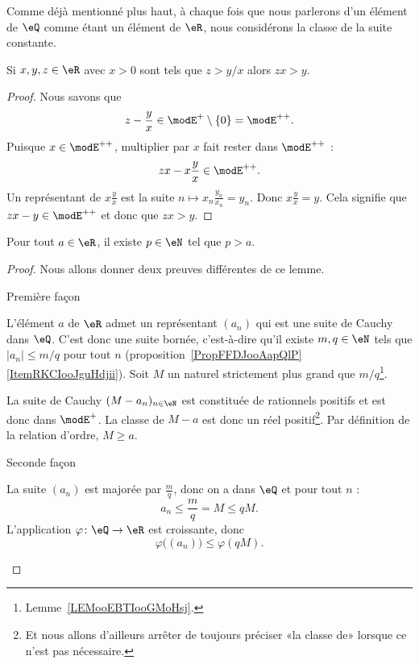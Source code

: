 \begin{remark}
	Comme déjà mentionné plus haut, à chaque fois que nous parlerons d'un élément de \( \eQ\) comme étant un élément de \( \eR\), nous considérons la classe de la suite constante.
\end{remark}

\begin{lemma}       \label{LemooYNOVooOwoRwD}
	Si \( x,y,z\in \eR\) avec \( x>0\) sont tels que \( z>y/x\) alors \( zx>y\).
\end{lemma}

\begin{proof}
	Nous savons que
	\begin{equation}
		z-\frac{ y }{ x }\in \modE^+\setminus\{ 0 \}=\modE^{++}.
	\end{equation}
	Puisque \( x\in\modE^{++}\), multiplier par \( x\) fait rester dans \( \modE^{++}\) :
	\begin{equation}
		zx-x\frac{ y }{ x }\in \modE^{++}.
	\end{equation}
	Un représentant de \( x\frac{ y }{ x }\) est la suite \( n\mapsto x_n\frac{ y_n }{ x_n }=y_n\). Donc \( x\frac{ y }{ x }=y\). Cela signifie que \( zx-y\in\modE^{++}\) et donc que \( zx>y\).
\end{proof}

\begin{lemma}       \label{LemooMWOUooVWgaEi}
	Pour tout \( a\in \eR\), il existe \( p\in \eN\) tel que \( p>a\).
\end{lemma}

\begin{proof}
	Nous allons donner deux preuves différentes de ce lemme.
	\begin{subproof}
		\item[Première façon]

		L'élément \( a\) de \( \eR\) admet un représentant \( (a_n)\) qui est une suite de Cauchy dans \( \eQ\). C'est donc une suite bornée, c'est-à-dire qu'il existe \( m,q\in \eN\) tels que \( | a_n |\leq m/q\) pour tout \( n\) (proposition~\ref{PropFFDJooAapQlP}\ref{ItemRKCIooJguHdjii}). Soit \( M\) un naturel strictement plus grand que \( m/q\)\footnote{Lemme~\ref{LEMooEBTIooGMoHsj}.}.

		La suite de Cauchy \( (M-a_n)_{n\in \eN}\) est constituée de rationnels positifs et est donc dans \( \modE^+\). La classe de \( M-a\) est donc un réel positif\footnote{Et nous allons d'ailleurs arrêter de toujours préciser «la classe de» lorsque ce n'est pas nécessaire.}. Par définition de la relation d'ordre, \( M\geq a\).
		\item[Seconde façon]

		La suite \( (a_n)\) est majorée par \( \frac{ m }{ q }\), donc on a dans \( \eQ\) et pour tout \( n\) :
		\begin{equation}
			a_n\leq \frac{ m }{ q }=M\leq qM.
		\end{equation}
		L'application \( \varphi\colon \eQ\to \eR\) est croissante, donc
		\begin{equation}
			\varphi\big( (a_n) \big)\leq \varphi(qM).
		\end{equation}
	\end{subproof}
\end{proof}

